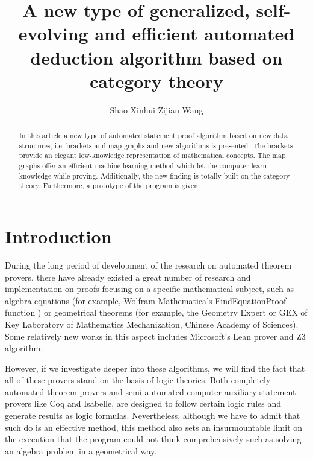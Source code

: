 \documentclass{aims}
\numberwithin{equation}{section}
\numberwithin{theorem}{section}	%
\numberwithin{axiom}{section}	%
\numberwithin{definition}{section}	%
\begin{document}
	\title{A new type of generalized, self-evolving and efficient automated deduction algorithm based on category theory}
	\author{%
		Shao Xinhui\corrauth
		Zijian Wang
	}
	\address{%
	}

	\begin{abstract}
	In this article a new type of automated statement proof algorithm based on new data structures, i.e. brackets and map graphs
	and new algorithms is presented. The brackets provide an elegant low-knowledge representation of mathematical concepts. The map graphs offer an efficient machine-learning method which let the computer learn knowledge while proving. Additionally, the new finding is totally built on the category theory. Furthermore, a prototype of the program is given.
	\end{abstract}


	\maketitle
	
	\section{Introduction}
	During the long period of development of the research on automated theorem provers, there have already existed a great number of research and implementation on proofs focusing on a specific mathematical subject, such as algebra equations (for example, Wolfram Mathematica{'}s FindEquationProof function \cite{Wolfram2019}) or geometrical theorems (for example, the Geometry Expert or GEX \cite{Gao1998} of Key Laboratory of Mathematics Mechanization, Chinese Academy of Sciences). Some relatively new works in this aspect includes Microsoft{'}s Lean prover \cite{Moura2021} and Z3 \cite{Moura2008} algorithm.
	
	However, if we investigate deeper into these algorithms, we will find the fact that all of these provers stand on the basis of logic theories. Both completely automated theorem provers and semi-automated computer auxiliary statement provers like Coq and Isabelle, are designed to follow certain logic rules and generate results as logic formulas. Nevertheless, although we have to admit that such do is an effective method, this method also sets an insurmountable limit on the execution that the program could not think comprehensively such as solving an algebra problem in a geometrical way.
	
\end{document}
